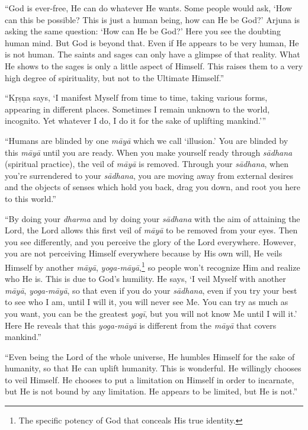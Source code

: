\enquote{God is ever-free, He can do whatever He wants. Some people would ask, \enquote{How can this be possible? This is just a human being, how can He be God?} Arjuna is asking the same question: \enquote{How can He be God?} Here you see the doubting human mind. But God is beyond that. Even if He appears to be very human, He is not human. The saints and sages can only have a glimpse of that reality. What He shows to the sages is only a little aspect of Himself. This raises them to a very high degree of spirituality, but not to the Ultimate Himself.}

\enquote{Kṛṣṇa says, \enquote{I manifest Myself from time to time, taking various forms, appearing in different places. Sometimes I remain unknown to the world, incognito. Yet whatever I do, I do it for the sake of uplifting mankind.}}

\enquote{Humans are blinded by one \textit{māyā} which we call \enquote{illusion.} You are blinded by this \textit{māyā} until you are ready. When you make yourself ready through \textit{sādhana} (spiritual practice), the veil of \textit{māyā} is removed. Through your \textit{sādhana}, when you’re surrendered to your \textit{sādhana}, you are moving away from external desires and the objects of senses which hold you back, drag you down, and root you here to this world.}

\enquote{By doing your \textit{dharma} and by doing your \textit{sādhana} with the aim of attaining the Lord, the Lord allows this first veil of \textit{māyā} to be removed from your eyes. Then you see differently, and you perceive the glory of the Lord everywhere. However, you are not perceiving Himself everywhere because by His own will, He veils Himself by another \textit{māyā}, \textit{yoga-māyā},\footnote{The specific potency of God that conceals His true identity.} so people won’t recognize Him and realize who He is. This is due to God’s humility. He says, \enquote{I veil Myself with another \textit{māyā}, \textit{yoga-māyā}, so that even if you do your \textit{sādhana}, even if you try your best to see who I am, until I will it, you will never see Me. You can try as much as you want, you can be the greatest \textit{yogī}, but you will not know Me until I will it.} Here He reveals that this \textit{yoga-māyā} is different from the \textit{māyā} that covers mankind.}

\enquote{Even being the Lord of the whole universe, He humbles Himself for the sake of humanity, so that He can uplift humanity. This is wonderful. He willingly chooses to veil Himself. He chooses to put a limitation on Himself in order to incarnate, but He is not bound by any limitation. He appears to be limited, but He is not.}

